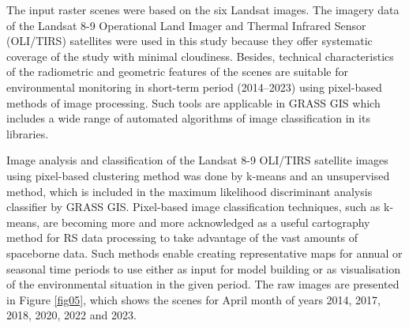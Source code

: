 \documentclass[12pt,a4paper,oneside]{article}
\def \newpar{\vspace{6pt}}
\begin{document}
\newpar The input raster scenes were based on the six Landsat images. The imagery data of the Landsat 8-9 Operational Land Imager and Thermal Infrared Sensor (OLI/TIRS) satellites were used in this study because they offer systematic coverage of the study with minimal cloudiness. Besides, technical characteristics of the radiometric and geometric features of the scenes are suitable for environmental monitoring in short-term period (2014–2023) using pixel-based methods of image processing. Such tools are applicable in GRASS GIS which includes a wide range of automated algorithms of image classification in its libraries. 

\newpar Image analysis and classification of the Landsat 8-9 OLI/TIRS satellite images using pixel-based clustering method was done by k-means and an unsupervised method, which is included in the maximum likelihood discriminant analysis classifier by GRASS GIS. Pixel-based image classification techniques, such as k-means, are becoming more and more acknowledged as a useful cartography method for RS data processing to take advantage of the vast amounts of spaceborne data. Such methods enable creating representative maps for annual or seasonal time periods to use either as input for model building or as visualisation of the environmental situation in the given period. The raw images are presented in Figure \ref{fig05}, which shows the scenes for April month of years 2014, 2017, 2018, 2020, 2022 and 2023.
\end{document}
